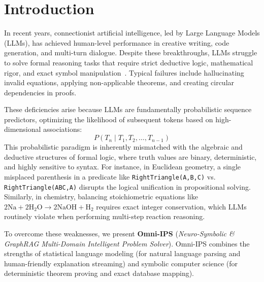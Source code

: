 \section{Introduction}
\label{sec:intro}

In recent years, connectionist artificial intelligence, led by Large Language Models (LLMs), has achieved human-level performance in creative writing, code generation, and multi-turn dialogue. Despite these breakthroughs, LLMs struggle to solve formal reasoning tasks that require strict deductive logic, mathematical rigor, and exact symbol manipulation~\cite{creswell2018selection}. Typical failures include hallucinating invalid equations, applying non-applicable theorems, and creating circular dependencies in proofs. 

These deficiencies arise because LLMs are fundamentally probabilistic sequence predictors, optimizing the likelihood of subsequent tokens based on high-dimensional associations:
\begin{equation}
    P(T_n \mid T_{1}, T_{2}, \dots, T_{n-1})
\end{equation}
This probabilistic paradigm is inherently mismatched with the algebraic and deductive structures of formal logic, where truth values are binary, deterministic, and highly sensitive to syntax. For instance, in Euclidean geometry, a single misplaced parenthesis in a predicate like \texttt{RightTriangle(A,B,C)} vs. \texttt{RightTriangle(ABC,A)} disrupts the logical unification in propositional solving. Similarly, in chemistry, balancing stoichiometric equations like $2\text{Na} + 2\text{H}_2\text{O} \to 2\text{NaOH} + \text{H}_2$ requires exact integer conservation, which LLMs routinely violate when performing multi-step reaction reasoning.

To overcome these weaknesses, we present \textbf{Omni-IPS} (\textit{Neuro-Symbolic \& GraphRAG Multi-Domain Intelligent Problem Solver}). Omni-IPS combines the strengths of statistical language modeling (for natural language parsing and human-friendly explanation streaming) and symbolic computer science (for deterministic theorem proving and exact database mapping). 

